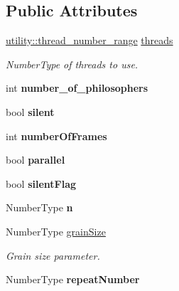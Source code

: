 \subsection*{Public Attributes}
\begin{DoxyCompactItemize}
\item 
\hyperlink{structutility_1_1thread__number__range}{utility\+::thread\+\_\+number\+\_\+range} \hyperlink{structRunOptions_aaec23c1325e3da318e63d168a606e7e8}{threads}
\begin{DoxyCompactList}\small\item\em Number\+Type of threads to use. \end{DoxyCompactList}\item 
\hypertarget{structRunOptions_a2decbaa220fa9dc03b8821b06e183e37}{}int {\bfseries number\+\_\+of\+\_\+philosophers}\label{structRunOptions_a2decbaa220fa9dc03b8821b06e183e37}

\item 
\hypertarget{structRunOptions_af1d6e27fff6735cda0fedd1181dee8f4}{}bool {\bfseries silent}\label{structRunOptions_af1d6e27fff6735cda0fedd1181dee8f4}

\item 
\hypertarget{structRunOptions_a182762871b725d05bfcdcbce16137348}{}int {\bfseries number\+Of\+Frames}\label{structRunOptions_a182762871b725d05bfcdcbce16137348}

\item 
\hypertarget{structRunOptions_ab86af989c27b078359e8d8d60d8ec8a3}{}bool {\bfseries parallel}\label{structRunOptions_ab86af989c27b078359e8d8d60d8ec8a3}

\item 
\hypertarget{structRunOptions_ad54e3997ac59def4024e6409b06f84e5}{}bool {\bfseries silent\+Flag}\label{structRunOptions_ad54e3997ac59def4024e6409b06f84e5}

\item 
\hypertarget{structRunOptions_a19493a6040c8b90aa46620c30198f736}{}Number\+Type {\bfseries n}\label{structRunOptions_a19493a6040c8b90aa46620c30198f736}

\item 
\hypertarget{structRunOptions_a59c112fa7b3e61243306255fb1c9e56c}{}Number\+Type \hyperlink{structRunOptions_a59c112fa7b3e61243306255fb1c9e56c}{grain\+Size}\label{structRunOptions_a59c112fa7b3e61243306255fb1c9e56c}

\begin{DoxyCompactList}\small\item\em Grain size parameter. \end{DoxyCompactList}\item 
\hypertarget{structRunOptions_ac3e4e0bf06d3467eb9ab8a3ce574592d}{}Number\+Type {\bfseries repeat\+Number}\label{structRunOptions_ac3e4e0bf06d3467eb9ab8a3ce574592d}

\end{DoxyCompactItemize}


